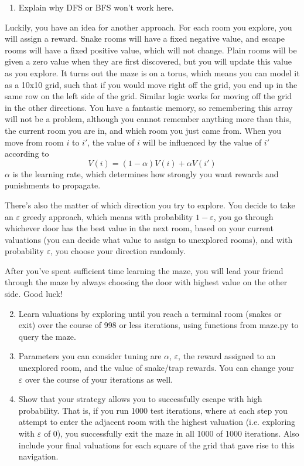 \documentclass[11pt]{article}
\begin{document}
\begin{enumerate}
    \item Explain why DFS or BFS won't work here.
\end{enumerate}

Luckily, you have an idea for another approach. For each room you explore, you will assign a reward. Snake rooms will have a fixed negative value, and escape rooms will have a fixed positive value, which will not change. Plain rooms will be given a zero value when they are first discovered, but you will update this value as you explore. It turns out the maze is on a torus, which means you can model it as a 10x10 grid, such that if you would move right off the grid, you end up in the same row on the left side of the grid. Similar logic works for moving off the grid in the other directions. You have a fantastic memory, so remembering this array will not be a problem, although you cannot remember anything more than this, the current room you are in, and which room you just came from. When you move from room $i$ to $i'$, the value of $i$ will be influenced by the value of $i'$ according to $$V(i) = (1-\alpha)V(i) + \alpha V(i')$$ $\alpha$ is the learning rate, which determines how strongly you want rewards and punishments to propagate. 

There's also the matter of which direction you try to explore. You decide to take an $\varepsilon$ greedy approach, which means with probability $1-\varepsilon$, you go through whichever door has the best value in the next room, based on your current valuations (you can decide what value to assign to unexplored rooms), and with probability $\varepsilon$, you choose your direction randomly. 

After you've spent sufficient time learning the maze, you will lead your friend through the maze by always choosing the door with highest value on the other side. Good luck!

\begin{enumerate}
    \setcounter{enumi}{1}
    \item Learn valuations by exploring until you reach a terminal room (snakes or exit) over the course of 998 or less iterations, using functions from maze.py to query the maze.
    \item Parameters you can consider tuning are $\alpha$, $\varepsilon$, the reward assigned to an unexplored room, and the value of snake/trap rewards. You can change your $\varepsilon$ over the course of your iterations as well.
    \item Show that your strategy allows you to successfully escape with high probability. That is, if you run 1000 test iterations, where at each step you attempt to enter the adjacent room with the highest valuation (i.e. exploring with $\varepsilon$ of 0), you successfully exit the maze in all 1000 of 1000 iterations. Also include your final valuations for each square of the grid that gave rise to this navigation.
\end{enumerate}
\end{document}

